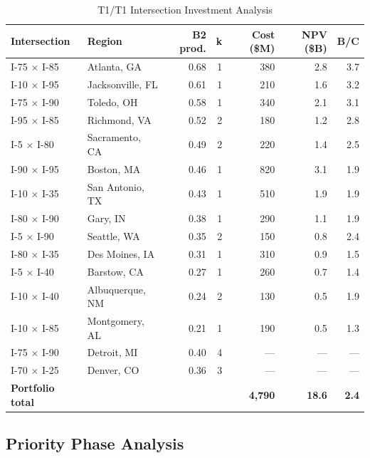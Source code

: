 \begin{table}[h!]
\centering
\caption{T1/T1 Intersection Investment Analysis}
\label{tab:investment}
\begin{tabular}{llrrrrr}
\toprule
\textbf{Intersection} & \textbf{Region} & \textbf{B2 prod.} & \textbf{k} & \textbf{Cost (\$M)} & \textbf{NPV (\$B)} & \textbf{B/C} \\
\midrule
I-75 $\times$ I-85   & Atlanta, GA       & 0.68 & 1 & 380 & 2.8 & 3.7 \\
I-10 $\times$ I-95   & Jacksonville, FL  & 0.61 & 1 & 210 & 1.6 & 3.2 \\
I-75 $\times$ I-90   & Toledo, OH        & 0.58 & 1 & 340 & 2.1 & 3.1 \\
I-95 $\times$ I-85   & Richmond, VA      & 0.52 & 2 & 180 & 1.2 & 2.8 \\
I-5  $\times$ I-80   & Sacramento, CA    & 0.49 & 2 & 220 & 1.4 & 2.5 \\
I-90 $\times$ I-95   & Boston, MA        & 0.46 & 1 & 820 & 3.1 & 1.9 \\
I-10 $\times$ I-35   & San Antonio, TX   & 0.43 & 1 & 510 & 1.9 & 1.9 \\
I-80 $\times$ I-90   & Gary, IN          & 0.38 & 1 & 290 & 1.1 & 1.9 \\
I-5  $\times$ I-90   & Seattle, WA       & 0.35 & 2 & 150 & 0.8 & 2.4 \\
I-80 $\times$ I-35   & Des Moines, IA    & 0.31 & 1 & 310 & 0.9 & 1.5 \\
I-5  $\times$ I-40   & Barstow, CA       & 0.27 & 1 & 260 & 0.7 & 1.4 \\
I-10 $\times$ I-40   & Albuquerque, NM   & 0.24 & 2 & 130 & 0.5 & 1.9 \\
I-10 $\times$ I-85   & Montgomery, AL    & 0.21 & 1 & 190 & 0.5 & 1.3 \\
\midrule
I-75 $\times$ I-90   & Detroit, MI       & 0.40 & 4 & ---  & ---  & --- \\
I-70 $\times$ I-25   & Denver, CO        & 0.36 & 3 & ---  & ---  & --- \\
\midrule
\textbf{Portfolio total} & & & & \textbf{4,790} & \textbf{18.6} & \textbf{2.4} \\
\bottomrule
\end{tabular}
\end{table}

\subsection{Priority Phase Analysis}

